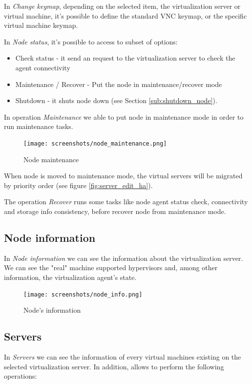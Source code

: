 In \emph{Change keymap}, depending on the selected item, the virtualization server or virtual machine, it's possible to define the standard VNC keymap, or the specific virtual machine keymap.

In \emph{Node status}, it's possible to access to subset of options:
\begin{itemize}
    \item Check status - it send an request to the virtualization server to check the agent connectivity
    \item Maintenance / Recover - Put the node in maintenance/recover mode
    \item Shutdown - it shuts node down (see Section \ref{sub:shutdown_node}).
\end{itemize}

In operation \emph{Maintenance} we able to put node in maintenance mode in order to run maintenance tasks.
\begin{figure}[H]
   \begin{center}
   \texttt{[image: screenshots/node\_maintenance.png]}
   \caption{Node maintenance}
   \label{fig:node_maintenance}
   \end{center}
\end{figure}
When node is moved to maintenance mode, the virtual servers will be migrated by priority order (see figure \ref{fig:server_edit_ha}).

The operation \emph{Recover} runs some tasks like node agent status check, connectivity and storage info consistency, before recover node from maintenance mode.

\subsection{Node information}
\label{sec:nodeinfo}
In \emph{Node information} we can see the information about the virtualization server. We can see the "real" machine supported hypervisors and, among other information, the virtualization agent's state.

\begin{figure}[H]
	\begin{center}
	\texttt{[image: screenshots/node\_info.png]}
	\caption{Node's information}
	\label{fig:node_info}
	\end{center}
\end{figure}

\subsection{Servers}
\label{sec:servers}
In \emph{Servers} we can see the information of every virtual machines existing on the selected virtualization server. In addition, allows to perform the following operations:

